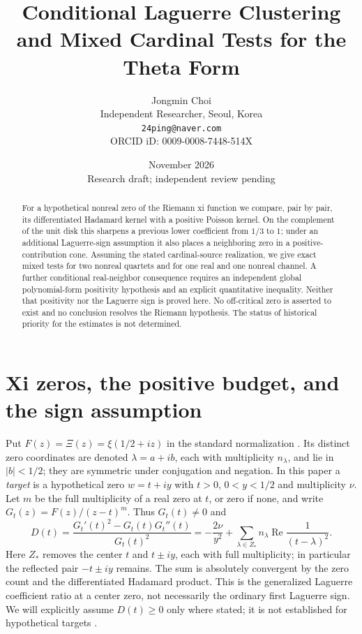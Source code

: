 \documentclass[11pt,a4paper]{article}
\title{Conditional Laguerre Clustering and Mixed Cardinal Tests for the Theta Form}
\author{Jongmin Choi\\Independent Researcher, Seoul, Korea\\\texttt{24ping@naver.com}\\ORCID iD: 0009-0008-7448-514X}
\date{November 2026\\Research draft; independent review pending}
\begin{document}
\maketitle
\begin{abstract}
For a hypothetical nonreal zero of the Riemann xi function we compare, pair by pair, its differentiated Hadamard kernel with a positive Poisson kernel. On the complement of the unit disk this sharpens a previous lower coefficient from $1/3$ to $1$; under an additional Laguerre-sign assumption it also places a neighboring zero in a positive-contribution cone. Assuming the stated cardinal-source realization, we give exact mixed tests for two nonreal quartets and for one real and one nonreal channel. A further conditional real-neighbor consequence requires an independent global polynomial-form positivity hypothesis and an explicit quantitative inequality. Neither that positivity nor the Laguerre sign is proved here. No off-critical zero is asserted to exist and no conclusion resolves the Riemann hypothesis. The status of historical priority for the estimates is not determined.
\end{abstract}
\section{Xi zeros, the positive budget, and the sign assumption}\label{sec:zeros}
Put $F(z)=\Xi(z)=\xi(1/2+iz)$ in the standard normalization \cite{DLMF}. Its distinct zero coordinates are denoted $\lambda=a+ib$, each with multiplicity $n_\lambda$, and lie in $|b|<1/2$; they are symmetric under conjugation and negation. In this paper a \emph{target} is a hypothetical zero $w=t+iy$ with $t>0$, $0<y<1/2$ and multiplicity $\nu$. Let $m$ be the full multiplicity of a real zero at $t$, or zero if none, and write $G_t(z)=F(z)/(z-t)^m$. Thus $G_t(t)\ne0$ and
\begin{equation}\label{eq:D}
 D(t)=\frac{G_t'(t)^2-G_t(t)G_t''(t)}{G_t(t)^2}=-\frac{2\nu}{y^2}+\sum_{\lambda\in Z_*}n_\lambda\operatorname{Re}\frac1{(t-\lambda)^2}.
\end{equation}
Here $Z_*$ removes the center $t$ and $t\pm iy$, each with full multiplicity; in particular the reflected pair $-t\pm iy$ remains. The sum is absolutely convergent by the zero count and the differentiated Hadamard product. This is the generalized Laguerre coefficient ratio at a center zero, not necessarily the ordinary first Laguerre sign. We will explicitly assume $D(t)\ge0$ only where stated; it is not established for hypothetical targets \cite{laguerre}.
\end{document}

